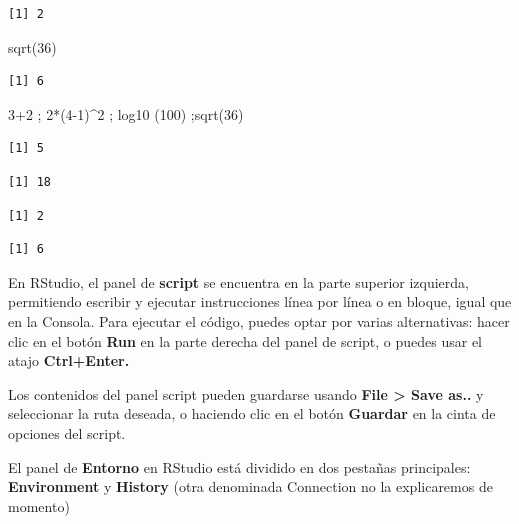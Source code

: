 \documentclass[
  letterpaper,
  DIV=11,
  numbers=noendperiod]{scrreprt}
\newenvironment{Shaded}{\begin{snugshade}}{\end{snugshade}}
\newcommand{\DecValTok}[1]{\textcolor[rgb]{0.68,0.00,0.00}{#1}}
\newcommand{\FunctionTok}[1]{\textcolor[rgb]{0.28,0.35,0.67}{#1}}
\newcommand{\NormalTok}[1]{\textcolor[rgb]{0.00,0.23,0.31}{#1}}
\newcommand{\SpecialCharTok}[1]{\textcolor[rgb]{0.37,0.37,0.37}{#1}}
\begin{document}
\begin{verbatim}
[1] 2
\end{verbatim}

\begin{Shaded}
\begin{Highlighting}[]
\FunctionTok{sqrt}\NormalTok{(}\DecValTok{36}\NormalTok{)}
\end{Highlighting}
\end{Shaded}

\begin{verbatim}
[1] 6
\end{verbatim}

\begin{Shaded}
\begin{Highlighting}[]
\DecValTok{3}\SpecialCharTok{+}\DecValTok{2}\NormalTok{ ; }\DecValTok{2}\SpecialCharTok{*}\NormalTok{(}\DecValTok{4{-}1}\NormalTok{)}\SpecialCharTok{\^{}}\DecValTok{2}\NormalTok{ ; }\FunctionTok{log10}\NormalTok{ (}\DecValTok{100}\NormalTok{) ;}\FunctionTok{sqrt}\NormalTok{(}\DecValTok{36}\NormalTok{)}
\end{Highlighting}
\end{Shaded}

\begin{verbatim}
[1] 5
\end{verbatim}

\begin{verbatim}
[1] 18
\end{verbatim}

\begin{verbatim}
[1] 2
\end{verbatim}

\begin{verbatim}
[1] 6
\end{verbatim}

En RStudio, el panel de \textbf{script} se encuentra en la parte
superior izquierda, permitiendo escribir y ejecutar instrucciones línea
por línea o en bloque, igual que en la Consola. Para ejecutar el código,
puedes optar por varias alternativas: hacer clic en el botón
\textbf{Run} en la parte derecha del panel de script, o puedes usar el
atajo \textbf{Ctrl+Enter.}

Los contenidos del panel script pueden guardarse usando \textbf{File
\textgreater{} Save as..} y seleccionar la ruta deseada, o haciendo clic
en el botón \textbf{Guardar} en la cinta de opciones del script.

El panel de \textbf{Entorno} en RStudio está dividido en dos pestañas
principales: \textbf{Environment} y \textbf{History} (otra denominada
Connection no la explicaremos de momento)
\end{document}
